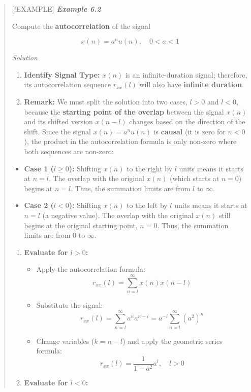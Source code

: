 \begin{quote}
{[}!EXAMPLE{]} \textbf{\emph{Example 6.2}}

Compute the \textbf{autocorrelation} of the signal

\[x(n) = a^n u(n), \quad 0 < a < 1\]

\emph{Solution}

\begin{enumerate}
\def\labelenumi{\arabic{enumi}.}
\tightlist
\item
  \textbf{Identify Signal Type:} \(x(n)\) is an infinite-duration
  signal; therefore, its autocorrelation sequence \(r_{xx}(l)\) will
  also have \textbf{infinite duration}.
\item
  \textbf{Remark:} We must split the solution into two cases, \(l > 0\)
  and \(l < 0\), because the \textbf{starting point of the overlap}
  between the signal \(x(n)\) and its shifted version \(x(n-l)\) changes
  based on the direction of the shift. Since the signal
  \(x(n) = a^n u(n)\) is \textbf{causal} (it is zero for \(n < 0\)), the
  product in the autocorrelation formula is only non-zero where both
  sequences are non-zero:
\end{enumerate}

\begin{itemize}
\tightlist
\item
  \textbf{Case 1 (\(l \ge 0\)):} Shifting \(x(n)\) to the right by \(l\)
  units means it starts at \(n = l\). The overlap with the original
  \(x(n)\) (which starts at \(n = 0\)) begins at \textbf{\(n = l\)}.
  Thus, the summation limits are from \(l\) to \(\infty\).
\item
  \textbf{Case 2 (\(l < 0\)):} Shifting \(x(n)\) to the left by \(l\)
  units means it starts at \(n = l\) (a negative value). The overlap
  with the original \(x(n)\) still begins at the original starting
  point, \textbf{\(n = 0\)}. Thus, the summation limits are from 0 to
  \(\infty\).
\end{itemize}

\begin{enumerate}
\def\labelenumi{\arabic{enumi}.}
\setcounter{enumi}{2}
\tightlist
\item
  \textbf{Evaluate for \(l > 0\):}

  \begin{itemize}
  \tightlist
  \item
    Apply the autocorrelation formula:
    \[r_{xx}(l) = \sum_{n=l}^{\infty} x(n)x(n-l)\]
  \item
    Substitute the signal:
    \[r_{xx}(l) = \sum_{n=l}^{\infty} a^n a^{n-l} = a^{-l} \sum_{n=l}^{\infty} (a^2)^n\]
  \item
    Change variables (\(k = n-l\)) and apply the geometric series
    formula: \[r_{xx}(l) = \frac{1}{1-a^2} a^l, \quad l > 0\]
  \end{itemize}
\item
  \textbf{Evaluate for \(l < 0\):}


\end{enumerate}
\end{quote}
